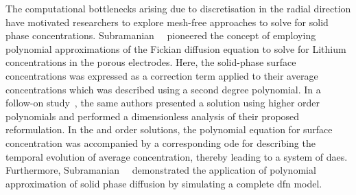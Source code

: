 The  computational  bottlenecks arising  due  to  discretisation in  the  radial
direction  have  motivated  researchers   to  explore  mesh-free  approaches  to
solve for  solid phase  concentrations. Subramanian~\etal~\cite{Subramanian2004}
pioneered  the concept  of employing  polynomial approximations  of the  Fickian
diffusion equation to solve for Lithium concentrations in the porous electrodes.
Here,  the solid-phase  surface  concentrations was  expressed  as a  correction
term  applied  to their  average  concentrations  which  was described  using  a
second degree polynomial. In  a follow-on study~\cite{Subramanian2005}, the same
authors  presented a  solution using  higher order  polynomials and  performed a
dimensionless analysis of their  proposed reformulation. In the 
and    order  solutions,  the polynomial  equation  for  surface
concentration was  accompanied by a  corresponding \gls{ode} for  describing the
temporal  evolution of  average concentration,  thereby leading  to a  system of
\gls{dae}s. Furthermore, Subramanian~\etal{}~\cite{Subramanian2007} demonstrated
the  application  of  polynomial  approximation  of  solid  phase  diffusion  by
simulating a complete \gls{dfn} model.


